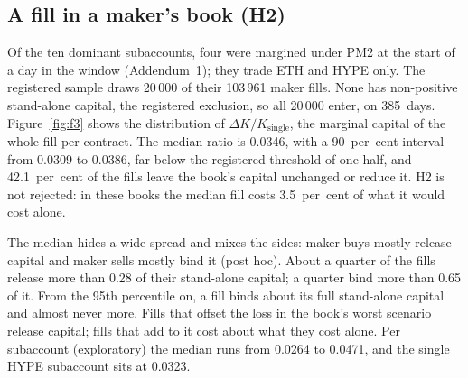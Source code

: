 \documentclass[a4paper,fleqn]{cas-dc}
\begin{document}
\subsection{A fill in a maker's book (H2)}
Of the ten dominant subaccounts, four were margined under PM2 at the start of a day in the window
(Addendum~1); they trade ETH and HYPE only. The registered sample draws 20\,000 of their 103\,961 maker fills. None has
non-positive stand-alone capital, the registered exclusion, so all 20\,000 enter, on 385~days.
Figure~\ref{fig:f3} shows the distribution of $\Delta K / K_{\text{single}}$, the marginal capital of the whole
fill per contract. The median ratio is 0.0346, with a 90~per~cent interval from 0.0309 to 0.0386, far below
the registered threshold of one half, and 42.1~per~cent of the fills leave the book's capital unchanged or
reduce it. H2 is not rejected: in these books the median fill costs 3.5~per~cent of what it would cost alone.

The median hides a wide spread and mixes the sides: maker buys mostly release capital and maker sells mostly
bind it (post hoc). About a quarter of the fills release more than 0.28 of their stand-alone capital;
a quarter bind more than 0.65 of it. From the 95th percentile on, a fill binds about its full stand-alone
capital and almost never more. Fills that offset the loss in the book's worst scenario release capital; fills
that add to it cost about what they cost alone. Per subaccount (exploratory) the median runs from 0.0264 to 0.0471,
and the single HYPE subaccount sits at 0.0323.
\end{document}
